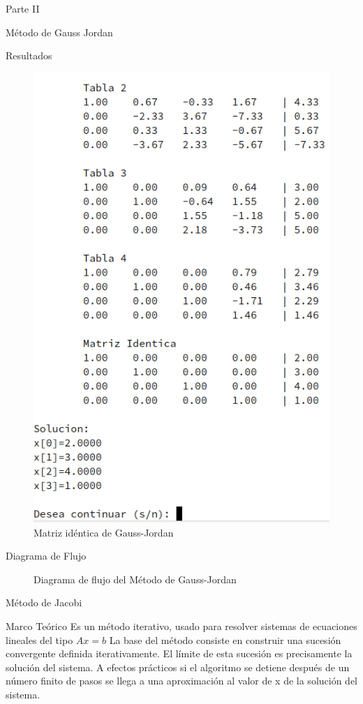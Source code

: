 \documentclass[legalpaper, 12pt]{article}
\begin{document}
\begin{section}{Parte II}
\begin{subsection}{Método de Gauss Jordan}
\begin{subsubsection}{Resultados}
\begin{figure}[h]
          \includegraphics[scale=0.9]{jordan.png}
          \caption{Matriz idéntica de Gauss-Jordan}
        \end{figure}
      \end{subsubsection}
      \newpage
      \begin{subsubsection}{Diagrama de Flujo}
        \begin{figure}[h]
          \centering
          
          \caption{Diagrama de flujo del Método de Gauss-Jordan}
        \end{figure}
      \end{subsubsection}
      \break
    \end{subsection}
    \begin{subsection}{Método de Jacobi}
      \begin{subsubsection}{Marco Teórico}
        Es un método iterativo, usado para resolver sistemas de ecuaciones
        lineales del tipo $Ax = b$
        La base del método consiste en construir una sucesión convergente
        definida iterativamente. El límite de esta sucesión es precisamente
        la solución del sistema. A efectos prácticos si el algoritmo se detiene
        después de un número finito de pasos se llega a una aproximación al valor
        de x de la solución del sistema.


\end{subsubsection}
\end{subsection}
\end{section}
\end{document}
